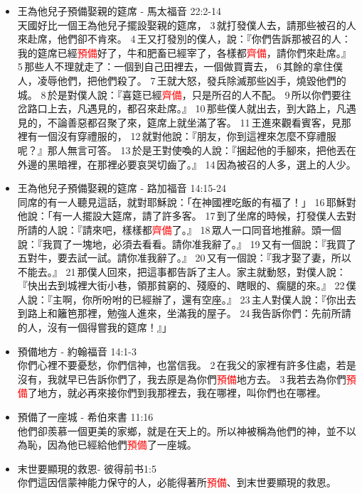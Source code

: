 \begin{itemize}
\item 王為他兒子預備娶親的筵席 - 馬太福音 22:2-14\\
天國好比一個王為他兒子擺設娶親的筵席， 3 就打發僕人去，請那些被召的人來赴席，他們卻不肯來。 4 王又打發別的僕人，說：『你們告訴那被召的人：我的筵席已經\textcolor{red}{預備}好了，牛和肥畜已經宰了，各樣都\textcolor{red}{齊備}，請你們來赴席。』 5 那些人不理就走了：一個到自己田裡去，一個做買賣去， 6 其餘的拿住僕人，凌辱他們，把他們殺了。 7 王就大怒，發兵除滅那些凶手，燒毀他們的城。 8 於是對僕人說：『喜筵已經\textcolor{red}{齊備}，只是所召的人不配。 9 所以你們要往岔路口上去，凡遇見的，都召來赴席。』 10 那些僕人就出去，到大路上，凡遇見的，不論善惡都召聚了來，筵席上就坐滿了客。 11 王進來觀看賓客，見那裡有一個沒有穿禮服的， 12 就對他說：『朋友，你到這裡來怎麼不穿禮服呢？』那人無言可答。 13 於是王對使喚的人說：『捆起他的手腳來，把他丟在外邊的黑暗裡，在那裡必要哀哭切齒了。』 14 因為被召的人多，選上的人少。
\item 王為他兒子預備娶親的筵席 - 路加福音 14:15-24\\
同席的有一人聽見這話，就對耶穌說：「在神國裡吃飯的有福了！」 16 耶穌對他說：「有一人擺設大筵席，請了許多客。 17 到了坐席的時候，打發僕人去對所請的人說：『請來吧，樣樣都\textcolor{red}{齊備}了。』 18 眾人一口同音地推辭。頭一個說：『我買了一塊地，必須去看看。請你准我辭了。』 19 又有一個說：『我買了五對牛，要去試一試。請你准我辭了。』 20 又有一個說：『我才娶了妻，所以不能去。』 21 那僕人回來，把這事都告訴了主人。家主就動怒，對僕人說：『快出去到城裡大街小巷，領那貧窮的、殘廢的、瞎眼的、瘸腿的來。』 22 僕人說：『主啊，你所吩咐的已經辦了，還有空座。』 23 主人對僕人說：『你出去到路上和籬笆那裡，勉強人進來，坐滿我的屋子。 24 我告訴你們：先前所請的人，沒有一個得嘗我的筵席！』」
\item 預備地方 - 約翰福音 14:1-3\\
你們心裡不要憂愁，你們信神，也當信我。 2 在我父的家裡有許多住處，若是沒有，我就早已告訴你們了，我去原是為你們\textcolor{red}{預備}地方去。 3 我若去為你們\textcolor{red}{預備}了地方，就必再來接你們到我那裡去，我在哪裡，叫你們也在哪裡。

\item 預備了一座城 - 希伯來書 11:16\\
他們卻羨慕一個更美的家鄉，就是在天上的。所以神被稱為他們的神，並不以為恥，因為他已經給他們\textcolor{red}{預備}了一座城。

\item 末世要顯現的救恩- 彼得前书1:5\\
你們這因信蒙神能力保守的人，必能得著所\textcolor{red}{預備}、到末世要顯現的救恩。

\end{itemize}










